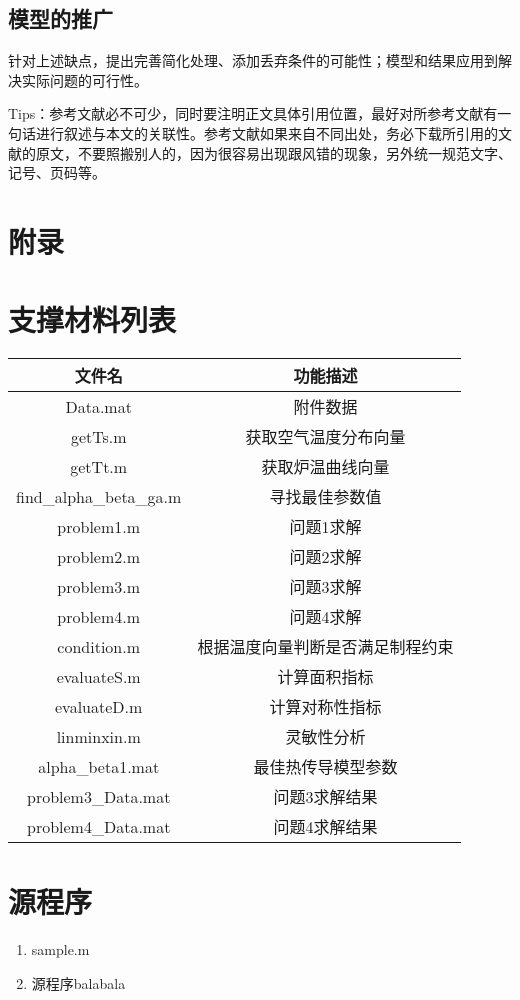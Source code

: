 \documentclass[12pt,utf8]{article}
\begin{document}
\subsection{模型的推广}
 针对上述缺点，提出完善简化处理、添加丢弃条件的可能性；模型和结果应用到解决实际问题的可行性。
 
\newpage


Tips：参考文献必不可少，同时要注明正文具体引用位置，最好对所参考文献有一句话进行叙述与本文的关联性。参考文献如果来自不同出处，务必下载所引用的文献的原文，不要照搬别人的，因为很容易出现跟风错的现象，另外统一规范文字、记号、页码等。

\clearpage

\section*{附录}

\appendix

\section{支撑材料列表}
\begin{table}[htbp]
	\centering
	\begin{tabular}{cc}
		\toprule[1.5pt]
		文件名   & 功能描述 \\
		\midrule
		Data.mat & 附件数据 \\
		getTs.m & 获取空气温度分布向量 \\
		getTt.m & 获取炉温曲线向量 \\
		find\_alpha\_beta\_ga.m & 寻找最佳参数值 \\
		problem1.m & 问题1求解 \\
		problem2.m & 问题2求解 \\
		problem3.m & 问题3求解 \\
		problem4.m & 问题4求解 \\
		condition.m & 根据温度向量判断是否满足制程约束 \\
		evaluateS.m & 计算面积指标 \\
		evaluateD.m & 计算对称性指标 \\
		linminxin.m & 灵敏性分析 \\
		alpha\_beta1.mat & 最佳热传导模型参数 \\
		problem3\_Data.mat & 问题3求解结果 \\
		problem4\_Data.mat & 问题4求解结果 \\
		\bottomrule[1.5pt]
	\end{tabular}%
	\label{tab:addlabel}%
\end{table}%

\section{源程序}
 
\begin{enumerate}
\item sample.m

\item 源程序balabala
\end{enumerate}
\end{document}
